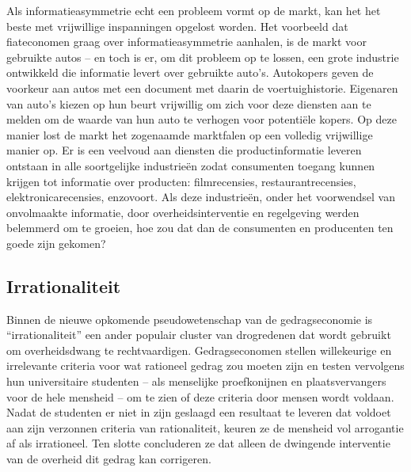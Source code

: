 Als informatieasymmetrie echt een probleem vormt op de markt, kan het het beste met vrijwillige inspanningen opgelost worden. Het voorbeeld dat fiateconomen graag over informatieasymmetrie aanhalen, is de markt voor gebruikte auto\textquotesingle s -- en toch is er, om dit probleem op te lossen, een grote industrie ontwikkeld die informatie levert over gebruikte auto's. Autokopers geven de voorkeur aan auto\textquotesingle s met een document met daarin de voertuighistorie. Eigenaren van auto's kiezen op hun beurt vrijwillig om zich voor deze diensten aan te melden om de waarde van hun auto te verhogen voor potentiële kopers. Op deze manier lost de markt het zogenaamde marktfalen op een volledig vrijwillige manier op. Er is een veelvoud aan diensten die productinformatie leveren ontstaan in alle soortgelijke industrieën zodat consumenten toegang kunnen krijgen tot informatie over producten: filmrecensies, restaurantrecensies, elektronicarecensies, enzovoort. Als deze industrieën, onder het voorwendsel van onvolmaakte informatie, door overheidsinterventie en regelgeving werden belemmerd om te groeien, hoe zou dat dan de consumenten en producenten ten goede zijn gekomen?

\subsection{Irrationaliteit}

Binnen de nieuwe opkomende pseudowetenschap van de gedragseconomie is ``irrationaliteit'' een ander populair cluster van drogredenen dat wordt gebruikt om overheidsdwang te rechtvaardigen. Gedragseconomen stellen willekeurige en irrelevante criteria voor wat rationeel gedrag zou moeten zijn en testen vervolgens hun universitaire studenten -- als menselijke proefkonijnen en plaatsvervangers voor de hele mensheid -- om te zien of deze criteria door mensen wordt voldaan. Nadat de studenten er niet in zijn geslaagd een resultaat te leveren dat voldoet aan zijn verzonnen criteria van rationaliteit, keuren ze de mensheid vol arrogantie af als irrationeel. Ten slotte concluderen ze dat alleen de dwingende interventie van de overheid dit gedrag kan corrigeren.

